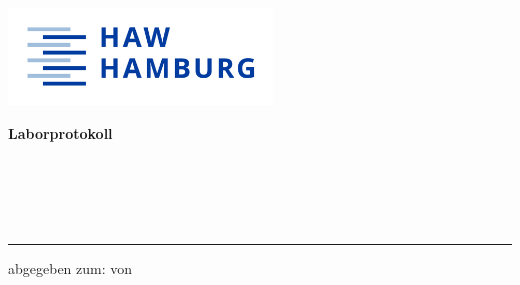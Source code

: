 
\makeatletter
\begin{titlepage}
    {\sffamily
    \color{haw}
    \raggedright
    \hfill\includegraphics[width=7cm]{src/HAW_Marke_RGB_300dpi.jpg}\\
  
    \vspace{5cm}
  
    \small
    \textbf{Laborprotokoll}
  
    \vspace{8mm}
  
    \begin{minipage}{0.8\linewidth}
      \LARGE
      \textbf{\@title\\[1mm]}
      \Large
      \textbf{\@subtitle\\[1mm]}
      
      \,\rule{11mm}{1.2mm}
    \end{minipage}
  
    \vspace{1cm}
  
    abgegeben zum: \abgabetermin{} von\\
    \@author
  
}
\end{titlepage}
